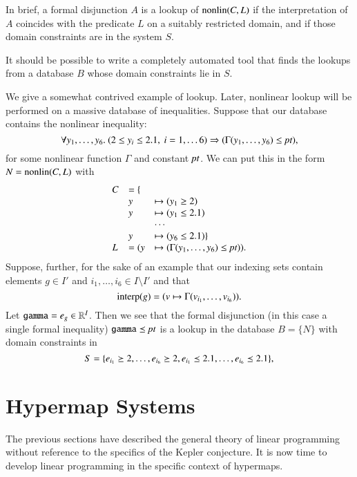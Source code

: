 In brief, a formal disjunction $A$ is a lookup of
${\operatorname{nonlin}}(C,L)$ if the interpretation of $A$ coincides with the
predicate $L$ on a suitably restricted domain, and if those domain
constraints are in the system $S$.

It should be possible to write a completely automated tool that
finds the lookups from a database $B$ whose domain constraints lie
in $S$.

\begin{example}  We give a somewhat contrived example of lookup.
Later, nonlinear lookup will be performed on a massive database of
inequalities.  Suppose that our database contains the nonlinear
inequality:
    $$\forall y_1,\ldots,y_6.\ (2\le y_i \le 2.1,\ i=1,\ldots
    6) \Rightarrow (\Gamma(y_1,\ldots,y_6) \le \hbox{\it pt}),
    $$
    for some nonlinear function $\Gamma$ and constant $\hbox{\it pt}$.
We can put this in the form $N = {\operatorname{nonlin}}(C,L)$ with
    $$
    \begin{array}{llll}
    C &= \{\\
        &y&\mapsto (y_1\ge 2)\\
        &y&\mapsto (y_1\le 2.1)\\
        &&\cdots\\
        &y&\mapsto (y_6\le 2.1)\}\\
    L &= (y&\mapsto (\Gamma(y_1,\ldots,y_6)\le \hbox{\it pt})).
    \end{array}
    $$
Suppose, further, for the sake of an example that our indexing
sets contain elements $g\in I'$ and $i_1,\ldots,i_6\in I\setminus
I'$ and that
    $$
    {\operatorname{interp}}(g) = (v \mapsto \Gamma(v_{i_1},\ldots,v_{i_6})).
    $$
Let ${\operatorname{{\texttt{gamma}}}} = e_g \in\mathbb{R}^{I}$. Then we see that the
formal disjunction (in this case a single formal inequality)
${\operatorname{{\texttt{gamma}}}} \preceq \hbox{\it pt}$ is a lookup in the database $B = \{N\}$
with domain constraints in
    $$
    S = \{e_{i_1}\succeq 2,\ldots,e_{i_6}\succeq 2,
          e_{i_1}\preceq 2.1,\ldots, e_{i_6}\preceq 2.1\},
    $$
\end{example}


\section{Hypermap Systems}

The previous sections have described the general theory of linear
programming without reference to the specifics of the Kepler
conjecture.  It is now time to develop linear programming in the
specific context of  hypermaps.

